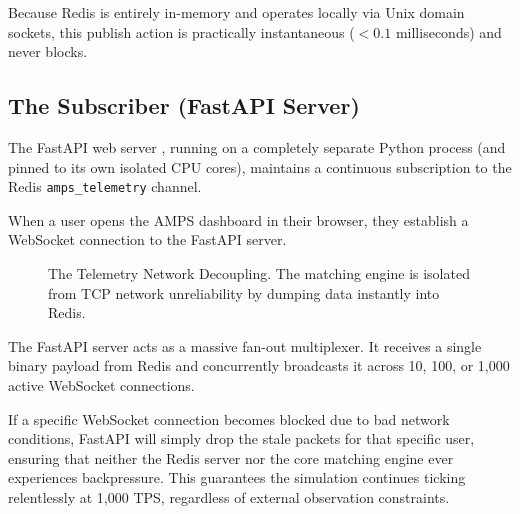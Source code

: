 Because Redis is entirely in-memory and operates locally via Unix domain sockets, this publish action is practically instantaneous ($<0.1$ milliseconds) and never blocks.

\subsection{The Subscriber (FastAPI Server)}
The FastAPI web server \cite{selivanov2016uvloop}, running on a completely separate Python process (and pinned to its own isolated CPU cores), maintains a continuous subscription to the Redis \texttt{amps\_telemetry} channel. 

When a user opens the AMPS dashboard in their browser, they establish a WebSocket connection to the FastAPI server. 

\begin{figure}[htbp]
\centering
{}
\caption{The Telemetry Network Decoupling. The matching engine is isolated from TCP network unreliability by dumping data instantly into Redis.}
\label{fig:redis_pubsub}
\end{figure}

The FastAPI server acts as a massive fan-out multiplexer. It receives a single binary payload from Redis and concurrently broadcasts it across 10, 100, or 1,000 active WebSocket connections. 

If a specific WebSocket connection becomes blocked due to bad network conditions, FastAPI will simply drop the stale packets for that specific user, ensuring that neither the Redis server nor the core matching engine ever experiences backpressure. This guarantees the simulation continues ticking relentlessly at 1,000 TPS, regardless of external observation constraints.
